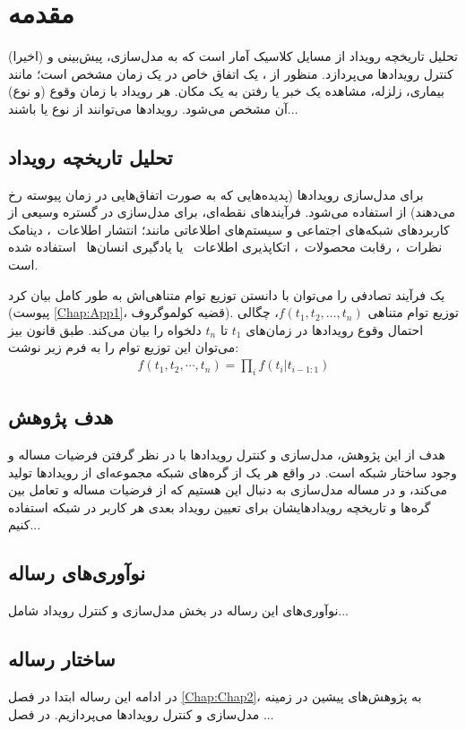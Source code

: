 \chapter{مقدمه}\label{Chap:Chap1}

تحلیل تاریخچه رویداد از مسایل کلاسیک آمار است که به مدل‌سازی، پیش‌بینی و   (اخیرا) کنترل رویداد‌ها می‌پردازد.
منظور از ، یک اتفاق خاص در یک زمان مشخص است؛ مانند بیماری، زلزله، مشاهده یک خبر یا رفتن به یک مکان.
هر رویداد با زمان وقوع (و نوع) آن مشخص می‌شود. 
 رویداد‌ها می‌توانند  از نوع  یا  باشند...
\section{تحلیل تاریخچه رویداد}
برای مدل‌سازی رویدادها (پدیده‌هایی که به صورت اتفاق‌هایی‌ در زمان پیوسته رخ می‌دهند) از 
 استفاده می‌شود.
فرآیندهای نقطه‌ای، برای مدل‌سازی در گستره وسیعی از کاربردهای شبکه‌های اجتماعی و سیستم‌های اطلاعاتی مانند؛ انتشار اطلاعات~\cite{Rodriguez2011, du13nips, zhao2015seismic}، دینامک نظرات~\cite{de2016learning}، رقابت محصولات~\cite{Valera2015,zarezade2015correlated}، اتکاپذیری اطلاعات~\cite{reliability2017tabibian} یا یادگیری انسان‌ها~\cite{hdhp2017learning} استفاده شده است.

 یک فرآیند تصادفی را می‌توان با دانستن توزیع توام متناهی‌اش به طور کامل بیان کرد  (پیوست \ref{Chap:App1}، قضیه کولموگروف).  
توزیع توام متناهی $f(t_1,t_2,\ldots,t_n)$،  چگالی احتمال وقوع رویدادها در زمان‌های $t_1$ تا $t_n$ دلخواه را بیان می‌کند.
طبق قانون بیز می‌توان این توزیع توام را به فرم زیر نوشت:
\begin{align}
	f(t_1,t_2,\cdots,t_n)=\prod_i f(t_i|t_{i-1:1})
\end{align}

\section{هدف پژوهش}
هدف از این پژوهش، مدل‌سازی و کنترل رویداد‌ها با در نظر گرفتن فرضیات مساله و وجود ساختار شبکه است.
در واقع هر یک از گره‌های شبکه مجموعه‌ای از رویدادها تولید می‌کند، و در مساله مدل‌سازی به دنبال این هستیم که از فرضیات مساله و تعامل بین گره‌‌ها و تاریخچه رویدادهایشان برای تعیین رویداد بعدی هر کاربر در شبکه استفاده کنیم...

\section{نوآوری‌های رساله}
نوآوری‌‌های این رساله در بخش مدل‌سازی و کنترل رویداد شامل...

\section{ساختار رساله}
در ادامه این رساله ابتدا در فصل  \ref{Chap:Chap2}، به پژوهش‌های پیشین در زمینه مدل‌سازی و کنترل رویدادها می‌پردازیم. در فصل ...


